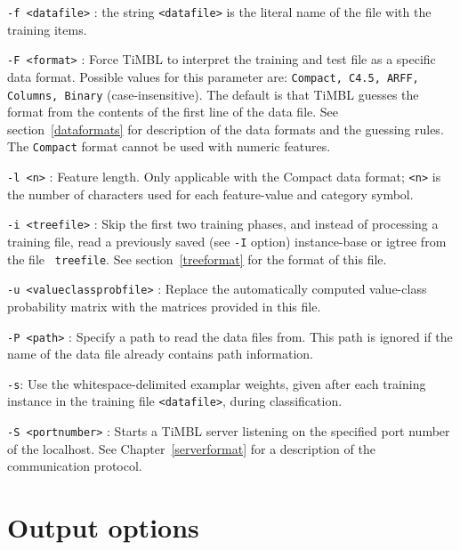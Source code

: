\documentclass{report}
\begin{document}
\begin{description}

\item {\tt -f <datafile>} : the string {\tt <datafile>} is the literal name
of the file with the training items.

\item {\tt -F <format>} : Force TiMBL to interpret the training and
test file as a specific data format. Possible values for this
parameter are: {\tt Compact, C4.5, ARFF, Columns, Binary}
(case-insensitive). The default is that TiMBL guesses the format from
the contents of the first line of the data file. See
section~\ref{dataformats} for description of the data formats and the
guessing rules. The {\tt Compact} format cannot be used with numeric
features.

\item {\tt -l <n>} : Feature length. Only applicable with the Compact
data format; {\tt <n>} is the number of characters used for each
feature-value and category symbol.

\item {\tt -i <treefile>} : Skip the first two training phases, and
instead of processing a training file, read a previously saved (see
{\tt -I} option) instance-base or {\sc igtree} from the file {\tt
treefile}. See section~\ref{treeformat} for the format of this file.

\item {\tt -u <valueclassprobfile>} : Replace the automatically computed
value-class probability matrix with the matrices provided in this
file.

\item {\tt -P <path>} : Specify a path to read the data files
from. This path is ignored if the name of the data file already
contains path information.

\item {\tt -s}: Use the whitespace-delimited examplar weights, given
after each training instance in the training file {\tt <datafile>},
during classification.

\item {\tt -S <portnumber>} : Starts a TiMBL server listening on the
specified port number of the localhost. See
Chapter~\ref{serverformat} for a description of the communication
protocol.

\end{description}

\section{Output options}
\end{document}
